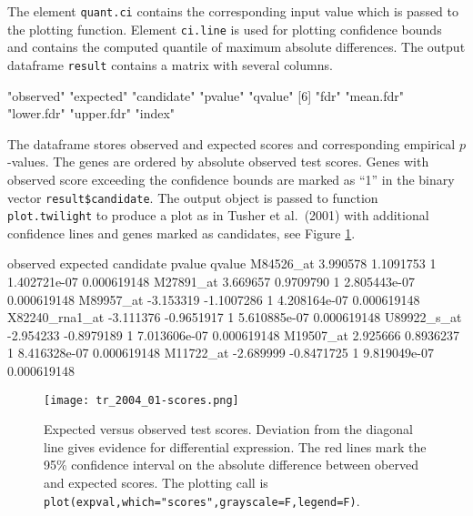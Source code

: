 \documentclass[11pt,a4paper,fleqn]{report}
\newcommand{\Robject}[1]{{\texttt{#1}}}
\newcommand{\Rfunction}[1]{{\texttt{#1}}}
\begin{document}
The element \Robject{quant.ci} contains the corresponding input value which is passed to the plotting function. Element \Robject{ci.line} is used for plotting confidence bounds and contains the computed quantile of maximum absolute differences.  The output dataframe \Robject{result} contains a matrix with several columns.
\begin{Schunk}
\begin{Soutput}
 [1] "observed"  "expected"  "candidate" "pvalue"    "qvalue"   
 [6] "fdr"       "mean.fdr"  "lower.fdr" "upper.fdr" "index"    
\end{Soutput}
\end{Schunk}

The dataframe stores observed and expected scores and corresponding empirical $p$-values. The genes are ordered by absolute observed test scores. Genes with observed score exceeding the confidence bounds are marked as ``1'' in the binary vector \Robject{result\$candidate}. The output object is passed to function \Rfunction{plot.twilight} to produce a plot as in Tusher et al.~(2001) \cite{tusher01} with additional confidence lines and genes marked as candidates, see Figure \ref{fig_scores}.
{\small
\begin{Schunk}
\begin{Soutput}
                observed   expected candidate       pvalue      qvalue
M84526_at       3.990578  1.1091753         1 1.402721e-07 0.000619148
M27891_at       3.669657  0.9709790         1 2.805443e-07 0.000619148
M89957_at      -3.153319 -1.1007286         1 4.208164e-07 0.000619148
X82240_rna1_at -3.111376 -0.9651917         1 5.610885e-07 0.000619148
U89922_s_at    -2.954233 -0.8979189         1 7.013606e-07 0.000619148
M19507_at       2.925666  0.8936237         1 8.416328e-07 0.000619148
M11722_at      -2.689999 -0.8471725         1 9.819049e-07 0.000619148
\end{Soutput}
\end{Schunk}
}
 

      
\begin{figure}[tp]
\centering
\texttt{[image: tr\_2004\_01-scores.png]}
\caption{Expected versus observed test scores. Deviation from the diagonal line gives evidence for differential expression. The red lines mark the 95\% confidence interval on the absolute difference between oberved and expected scores. The plotting call is \texttt{plot(expval,which="scores",grayscale=F,legend=F)}.}\label{fig_scores}
\end{figure}
\end{document}

